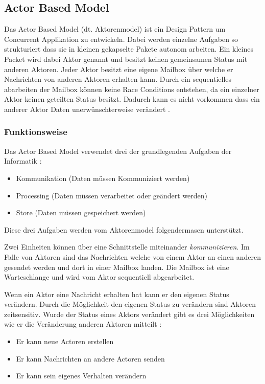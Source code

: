 \subsection{Actor Based Model}
\label{section:Actor Based Model}

Das Actor Based Model (dt. Aktorenmodel) ist ein Design Pattern um Concurrent Applikation zu entwickeln. Dabei werden einzelne Aufgaben so strukturiert dass sie in kleinen gekapselte Pakete autonom arbeiten. Ein kleines Packet wird dabei Aktor genannt und besitzt keinen gemeinsamen Status mit anderen Aktoren. Jeder Aktor besitzt eine eigene Mailbox über welche er Nachrichten von anderen Aktoren erhalten kann. Durch ein sequentielles abarbeiten der Mailbox können keine Race Conditions entstehen, da ein einzelner Aktor keinen geteilten Status besitzt. Dadurch kann es nicht vorkommen dass ein anderer Aktor Daten unerwünschterweise verändert \cite[p. 84]{Erb2012}. 

\subsubsection{Funktionsweise}

Das Actor Based Model verwendet drei der grundlegenden Aufgaben der Informatik \cite[p. 85]{Erb2012}:

\begin{itemize}
  \item Kommunikation (Daten müssen Kommuniziert werden)
  \item Processing (Daten müssen verarbeitet oder geändert werden)
  \item Store (Daten müssen gespeichert werden)
\end{itemize}

Diese drei Aufgaben werden vom Aktorenmodel folgendermasen unterstützt.

Zwei Einheiten können über eine Schnittstelle miteinander \emph{kommunizieren}. Im Falle von Aktoren sind das Nachrichten welche von einem Aktor an einen anderen gesendet werden und dort in einer Mailbox landen. Die Mailbox ist eine Warteschlange und wird vom Aktor sequentiell abgearbeitet. 

Wenn ein Aktor eine Nachricht erhalten hat kann er den eigenen Status verändern. Durch die Möglichkeit den eigenen Status zu verändern sind Aktoren zeitsensitiv. Wurde der Status eines Aktors verändert gibt es drei Möglichkeiten wie er die Veränderung anderen Aktoren mitteilt \cite[p. 84]{Erb2012}:

\begin{itemize}
  \item Er kann neue Actoren erstellen
  \item Er kann Nachrichten an andere Actoren senden
  \item Er kann sein eigenes Verhalten verändern
\end{itemize}

